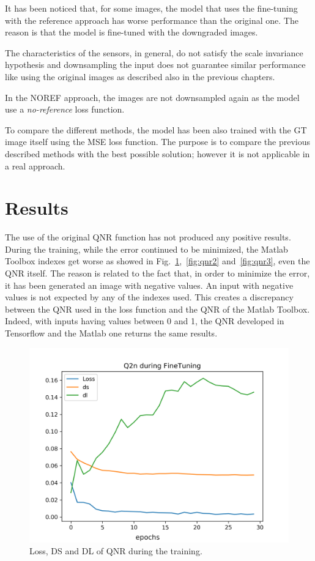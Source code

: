 \documentclass[12pt]{report}
\begin{document}
It has been noticed that, for some images, the model that uses the fine-tuning with the reference approach has worse performance than the original one.
The reason is that the model is fine-tuned with the downgraded images.

The characteristics of the sensors, in general, do not satisfy the scale invariance hypothesis and downsampling the input does not guarantee similar performance like using the original images
as described also in the previous chapters.

In the NOREF approach, the images are not downsampled again as the model use a \textit{no-reference} loss function.

To compare the different methods, the model has been also trained with the GT image itself using the MSE loss function.
The purpose is to compare the previous described methods with the best possible solution; however it is not applicable in a real approach.

\section{Results}
The use of the original QNR function has not produced any positive results.
During the training, while the error continued to be minimized, the Matlab Toolbox indexes get worse as showed in Fig.~\ref{fig:qnr1},~\ref{fig:qnr2} and~\ref{fig:qnr3}, even the QNR itself.
The reason is related to the fact that, in order to minimize the error, it has been generated an image with negative values.
An input with negative values is not expected by any of the indexes used.
This creates a discrepancy between the QNR used in the loss function and the QNR of the Matlab Toolbox.
Indeed, with inputs having values between 0 and 1, the QNR developed in Tensorflow and the Matlab one returns the same results.


\begin{figure}[t]
    \centering
    \includegraphics[scale=.7]{qnr1.png}
    \caption{Loss, DS and DL of QNR during the training.}
    \label{fig:qnr1}
\end{figure}
\end{document}
